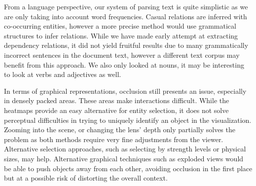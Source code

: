 From a language perspective, our system of parsing text is quite simplistic as
we are only taking into account word frequencies. Casual relations are inferred with
co-occurring entities, however a more precise method would use grammatical
structures to infer relations. While we have made early attempt at extracting
dependency relations, it did not yield fruitful results due to many grammatically
incorrect sentences in the document text, however a different text
corpus may benefit from this approach. We also only looked at nouns, it may be
interesting to look at verbs and adjectives as well.

In terms of graphical representations, occlusion still presents an issue,
especially in densely packed areas. These areas make interactions difficult.
While the heatmaps provide an easy alternative for entity selection, it does not
solve perceptual difficulties in trying to uniquely identify an object in the
visualization. Zooming into the scene, or changing the lens' depth only
partially solves the problem as both methods require very fine adjustments from
the viewer. Alternative selection approaches, such as selecting by
strength levels or physical sizes, may help. Alternative graphical techniques
such as exploded views would be able to push objects away from each other, avoiding occlusion in
the first place but at a possible risk of distorting the overall context.







